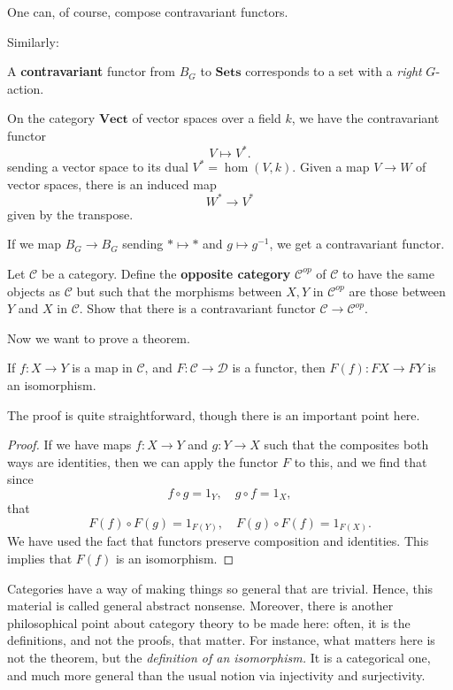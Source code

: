 One can, of course, compose contravariant functors.

Similarly:

\begin{example}
A \textbf{contravariant} functor from $B_G$ to $\mathbf{Sets}$ corresponds to a
set with a \emph{right} $G$-action.
\end{example}

\begin{example}
On the category $\mathbf{Vect}$ of vector spaces over a field $k$, we
have
the contravariant functor
\[ V \mapsto V^{\ast}.  \]
sending a vector space to its dual $V^{\ast} = \hom(V,k)$.
Given a map $V \to W$ of vector spaces, there is an induced map
\[ W^{\ast} \to V^{\ast}  \]
given by the transpose.
\end{example}

\begin{example}
If we map $B_G \to B_G$ sending $\ast \mapsto \ast$ and $g \mapsto g^{-1}$, we
get a
contravariant functor.
\end{example}

\begin{exercise}
Let $\mathcal{C}$ be a category. Define the \textbf{opposite category}
$\mathcal{C}^{op}$ of $\mathcal{C}$ to have the same objects as
$\mathcal{C}$  but such that the morphisms between $X,Y$ in
$\mathcal{C}^{op}$
are those between $Y$ and $X$ in $\mathcal{C}$.
Show that there is a contravariant functor $\mathcal{C} \to
\mathcal{C}^{op}$.
\end{exercise}
Now we want to prove a theorem.
\begin{proposition}
If $f: X \to Y$ is a map in $\mathcal{C}$, and $F: \mathcal{C} \to \mathcal{D}$
is a functor, then $F(f): FX \to FY$ is an isomorphism.
\end{proposition}

The proof is quite straightforward, though there is an important point here.


\begin{proof}
If we have maps $f: X \to Y$ and $g : Y \to X$ such that the composites both
ways are identities, then we can apply the functor $F$ to this, and we find
that since
\[ f \circ g = 1_Y, \quad g \circ f = 1_X,   \]
that
\[ F(f) \circ F(g) = 1_{F(Y)}, \quad F(g) \circ F(f) = 1_{F(X)}.  \]
We have used the fact that functors preserve composition and identities. This
implies that $F(f)$ is an isomorphism.
\end{proof}

Categories have a way of making things so general that are trivial. Hence,
this material is called general abstract nonsense.
Moreover, there is another philosophical point about category theory to
be made here: often, it is the definitions, and not the proofs, that matter.
For instance, what matters here is not the theorem, but the \emph{definition of
an
isomorphism.} It is a categorical one, and much more general than the usual
notion via injectivity and surjectivity.


